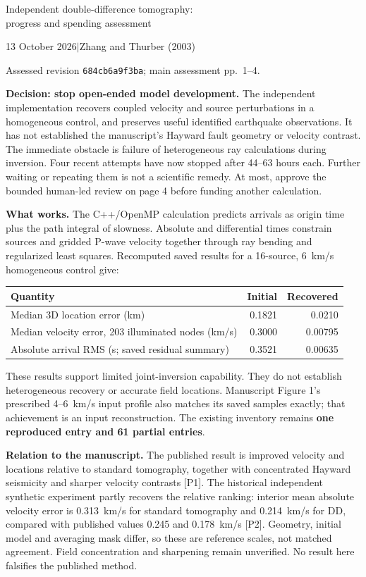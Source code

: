 \documentclass[10pt,letterpaper]{article}
\begin{document}
\begin{center}
{\Large Independent double-difference tomography:\\progress and spending assessment}\par
13 October 2026\quad$\vert$\quad Zhang and Thurber (2003)\par
\small Assessed revision \texttt{684cb6a9f3ba}; main assessment pp.\ 1--4.
\end{center}

\textbf{Decision: stop open-ended model development.}
The independent implementation recovers coupled velocity and source perturbations in a homogeneous control, and preserves useful identified earthquake observations. It has not established the manuscript's Hayward fault geometry or velocity contrast. The immediate obstacle is failure of heterogeneous ray calculations during inversion. Four recent attempts have now stopped after 44--63 hours each. Further waiting or repeating them is not a scientific remedy. At most, approve the bounded human-led review on page 4 before funding another calculation.

\textbf{What works.}
The C++/OpenMP calculation predicts arrivals as origin time plus the path integral of slowness. Absolute and differential times constrain sources and gridded P-wave velocity together through ray bending and regularized least squares. Recomputed saved results for a 16-source, 6~km/s homogeneous control give:

\begin{center}\begin{tabular}{lrr}\toprule
Quantity & Initial & Recovered\\\midrule
Median 3D location error (km) & 0.1821 & 0.0210\\
Median velocity error, 203 illuminated nodes (km/s) & 0.3000 & 0.00795\\
Absolute arrival RMS (s; saved residual summary) & 0.3521 & 0.00635\\\bottomrule
\end{tabular}\end{center}

These results support limited joint-inversion capability. They do not establish heterogeneous recovery or accurate field locations. Manuscript Figure 1's prescribed 4--6~km/s input profile also matches its saved samples exactly; that achievement is an input reconstruction. The existing inventory remains \textbf{one reproduced entry and 61 partial entries}.

\textbf{Relation to the manuscript.}
The published result is improved velocity and locations relative to standard tomography, together with concentrated Hayward seismicity and sharper velocity contrasts [P1]. The historical independent synthetic experiment partly recovers the relative ranking: interior mean absolute velocity error is 0.313~km/s for standard tomography and 0.214~km/s for DD, compared with published values 0.245 and 0.178~km/s [P2]. Geometry, initial model and averaging mask differ, so these are reference scales, not matched agreement. Field concentration and sharpening remain unverified. No result here falsifies the published method.
\end{document}
